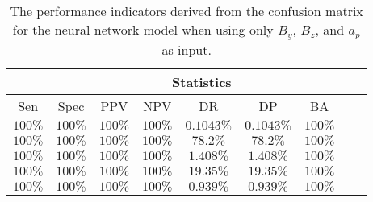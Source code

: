 \begin{table}[!ht]
	\centering
	\begin{tabular}{|c|c|c|c|c|c|c|c|c|}
		\hline
		 & \multicolumn{7}{c|}{Statistics} \\ \hline
		Sen & Spec & PPV & NPV & DR & DP & BA \\ \hline
		$100\%$ & $100\%$ & $100\%$ & $100\%$ & $0.1043\%$ & $0.1043\%$ & $100\%$ \\ \hline
		$100\%$ & $100\%$ & $100\%$ & $100\%$ & $78.2\%$ & $78.2\%$ & $100\%$ \\ \hline
		$100\%$ & $100\%$ & $100\%$ & $100\%$ & $1.408\%$ & $1.408\%$ & $100\%$ \\ \hline
		$100\%$ & $100\%$ & $100\%$ & $100\%$ & $19.35\%$ & $19.35\%$ & $100\%$ \\ \hline
		$100\%$ & $100\%$ & $100\%$ & $100\%$ & $0.939\%$ & $0.939\%$ & $100\%$ \\ \hline
	\end{tabular}
	\caption{The performance indicators derived from the confusion matrix for the neural network model when using only $B_{y}$, $B_{z}$, and $a_{p}$ as input.}
	\label{tab:cs:yzap:nnet}
\end{table}
